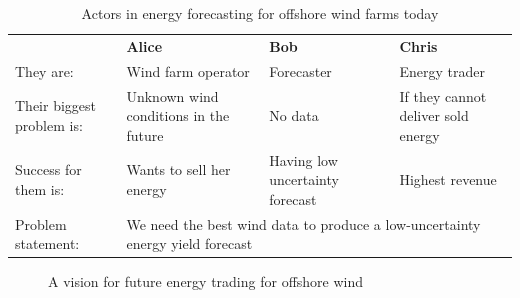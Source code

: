 \begin{table}[!h]
 \centering
 \caption{Actors in energy forecasting for offshore wind farms today}
 \begin{tabular}{@{}|p{}|p{}|p{}|p{}|@{}}
 \rowcolor{Task32Blue2} & \textbf{Alice} & \textbf{Bob} & \textbf{Chris}  \\
They are: & 
    Wind farm operator & 
    Forecaster & 
    Energy trader \\
Their biggest problem is: & 
    Unknown wind conditions in the future & 
    No data & 
    If they cannot deliver sold energy \\
Success for them is: & 
    Wants to sell her energy & 
    Having low uncertainty forecast & 
    Highest revenue \\
Problem statement: & 
    \multicolumn{3}{|p{0.765\textwidth+4\tabcolsep+2\arrayrulewidth}|}{We need the best wind data to produce a low-uncertainty energy yield forecast}\\
\end{tabular}
\label{tab:02_offshoreforecasting_now}
\end{table}


\begin{figure}
    \centering
    \caption{A vision for future energy trading for offshore wind}
    \label{fig:02_offshoreforecasting_future}
\end{figure}
